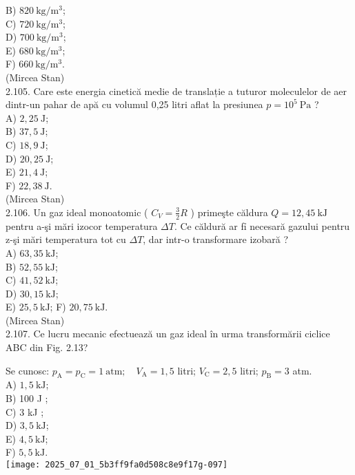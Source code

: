 B) $820 \mathrm{~kg} / \mathrm{m}^{3}$;\\
C) $720 \mathrm{~kg} / \mathrm{m}^{3}$;\\
D) $700 \mathrm{~kg} / \mathrm{m}^{3}$;\\
E) $680 \mathrm{~kg} / \mathrm{m}^{3}$;\\
F) $660 \mathrm{~kg} / \mathrm{m}^{3}$.\\
(Mircea Stan)\\
2.105. Care este energia cinetică medie de translație a tuturor moleculelor de aer dintr-un pahar de apă cu volumul 0,25 litri aflat la presiunea $p=10^{5} \mathrm{~Pa}$ ?\\
A) $2,25 \mathrm{~J}$;\\
B) $37,5 \mathrm{~J}$;\\
C) $18,9 \mathrm{~J}$;\\
D) $20,25 \mathrm{~J}$;\\
E) $21,4 \mathrm{~J}$;\\
F) $22,38 \mathrm{~J}$.\\
(Mircea Stan)\\
2.106. Un gaz ideal monoatomic ( $C_{V}=\frac{3}{2} R$ ) primeşte căldura $Q=12,45 \mathrm{~kJ}$ pentru a-şi mări izocor temperatura $\Delta T$. Ce căldură ar fỉ necesară gazului pentru z-şi mări temperatura tot cu $\Delta T$, dar intr-o transformare izobară ?\\
A) $63,35 \mathrm{~kJ}$;\\
B) $52,55 \mathrm{~kJ}$;\\
C) $41,52 \mathrm{~kJ}$;\\
D) $30,15 \mathrm{~kJ}$;\\
E) $25,5 \mathrm{~kJ}$; F) $20,75 \mathrm{~kJ}$.\\
(Mircea Stan)\\
2.107. Ce lucru mecanic efectuează un gaz ideal în urma transformării ciclice ABC din Fig. 2.13?

Se cunosc: $p_{\mathrm{A}}=p_{\mathrm{C}}=1 \mathrm{~atm} ; \quad V_{\mathrm{A}}=1,5$ litri; $V_{\mathrm{C}}=2,5$ litri; $p_{\mathrm{B}}=3$ atm.\\
A) $1,5 \mathrm{~kJ}$;\\
B) 100 J ;\\
C) 3 kJ ;\\
D) $3,5 \mathrm{~kJ}$;\\
E) $4,5 \mathrm{~kJ}$;\\
F) $5,5 \mathrm{~kJ}$.\\
\texttt{[image: 2025\_07\_01\_5b3ff9fa0d508c8e9f17g-097]}

